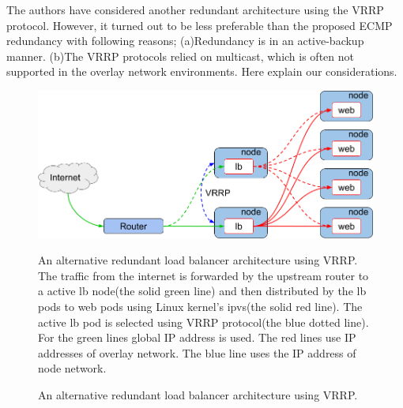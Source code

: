 The authors have considered another redundant architecture using the VRRP protocol.
However, it turned out to be less preferable than the proposed ECMP redundancy with following reasons;
(a)Redundancy is in an active-backup manner.
(b)The VRRP protocols relied on multicast, which is often not supported in the overlay network environments.
Here explain our considerations.

\begin{figure}[h]
\begin{center}
\includegraphics[width=0.9\columnwidth]{Figs/vrrp.png}
\end{center}

\par\bigskip
\centering
\begin{minipage}{0.9\columnwidth}
  \caption[An alternative redundant load balancer architecture using VRRP]{
    An alternative redundant load balancer architecture using VRRP.
    The traffic from the internet is forwarded by the upstream router to a active lb node(the solid green line) and then distributed by the lb pods to web pods using Linux kernel's ipvs(the solid red line).
    The active lb pod is selected using VRRP protocol(the blue dotted line).
    For the green lines global IP address is used. The red lines use IP addresses of overlay network.
    The blue line uses the IP address of node network.
  }
  \label{fig:vrrp}
\end{minipage}

\caption{ An alternative redundant load balancer architecture using VRRP.}

\end{figure}

